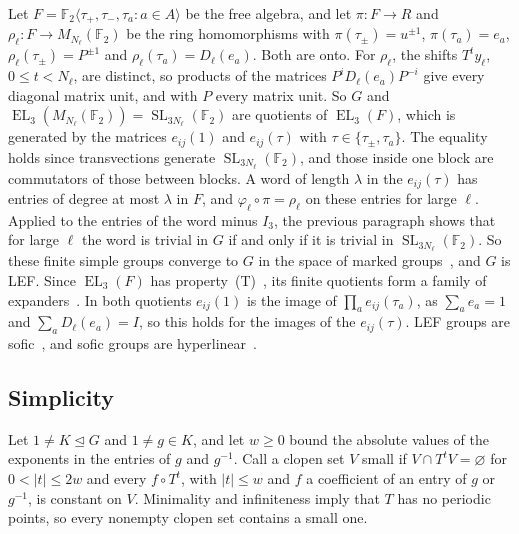 \documentclass[11pt]{amsart}
\newcommand{\F}{\mathbb F}
\newcommand{\EL}{\operatorname{EL}}
\newcommand{\SL}{\operatorname{SL}}
\begin{document}
Let $F=\F_2\langle\tau_+,\tau_-,\tau_a:a\in A\rangle$ be the free algebra,
and let $\pi\colon F\to R$ and $\rho_\ell\colon F\to M_{N_\ell}(\F_2)$ be
the ring homomorphisms with $\pi(\tau_\pm)=u^{\pm1}$, $\pi(\tau_a)=e_a$,
$\rho_\ell(\tau_\pm)=P^{\pm1}$ and $\rho_\ell(\tau_a)=D_\ell(e_a)$. Both
are onto. For $\rho_\ell$, the shifts $T^ty_\ell$, $0\le t<N_\ell$, are
distinct, so products of the matrices $P^iD_\ell(e_a)P^{-i}$ give every
diagonal matrix unit, and with $P$ every matrix unit. So $G$ and
$\EL_3(M_{N_\ell}(\F_2))=\SL_{3N_\ell}(\F_2)$ are quotients of $\EL_3(F)$,
which is generated by the matrices $e_{ij}(1)$ and $e_{ij}(\tau)$ with
$\tau\in\{\tau_\pm,\tau_a\}$. The equality holds since transvections
generate $\SL_{3N_\ell}(\F_2)$, and those inside one block are commutators
of those between blocks. A word of length $\lambda$ in the $e_{ij}(\tau)$
has entries of degree at most $\lambda$ in $F$, and
$\varphi_\ell\circ\pi=\rho_\ell$ on these entries for large $\ell$.
Applied to the entries of the word minus $I_3$, the previous paragraph
shows that for large $\ell$ the word is trivial in $G$ if and only if it
is trivial in $\SL_{3N_\ell}(\F_2)$. So these finite simple groups
converge to $G$ in the space of marked
groups~\cite{Grigorchuk,Champetier}, and $G$ is LEF. Since $\EL_3(F)$ has
property~\textup{(T)}~\cite[Theorem~1.1]{EJZ}, its finite quotients form
a family of expanders~\cite{Margulis,Kassabov}. In both quotients
$e_{ij}(1)$ is the image of $\prod_ae_{ij}(\tau_a)$, as $\sum_ae_a=1$ and
$\sum_aD_\ell(e_a)=I$, so this holds for the images of the
$e_{ij}(\tau)$. LEF groups are sofic~\cite[Example~4.5]{Pestov}, and
sofic groups are hyperlinear~\cite[Theorem~2]{ElekSzabo}.

\subsection*{Simplicity}
Let $1\ne K\trianglelefteq G$ and $1\ne g\in K$, and let $w\ge0$ bound
the absolute values of the exponents in the entries of $g$ and $g^{-1}$.
Call a clopen set $V$ small if $V\cap T^tV=\varnothing$ for
$0<|t|\le2w$ and every $f\circ T^t$, with $|t|\le w$ and $f$ a
coefficient of an entry of $g$ or $g^{-1}$, is constant on $V$.
Minimality and infiniteness imply that $T$ has no periodic points, so
every nonempty clopen set contains a small one.
\end{document}

